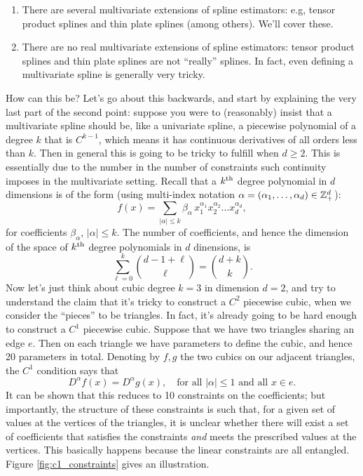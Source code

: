 \documentclass{article}
\begin{document}
\begin{enumerate}
\item There are several multivariate extensions of spline estimators: e.g,
  tensor product splines and thin plate splines (among others). We'll cover
  these. 
\item There are no real multivariate extensions of spline estimators: tensor
  product splines and thin plate splines are not ``really'' splines. In fact,
  even defining a multivariate spline is generally very tricky. 
\end{enumerate}

How can this be? Let's go about this backwards, and start by explaining the very
last part of the second point: suppose you were to (reasonably) insist that a 
multivariate spline should be, like a univariate spline, a piecewise polynomial
of a degree $k$ that is $C^{k-1}$, which means it has continuous derivatives of
all orders less than $k$. Then in general this is going to be tricky to fulfill
when $d \geq 2$. This is essentially due to the number in the number of
constraints such continuity imposes in the multivariate setting. Recall that a
$k^{\text{th}}$ degree polynomial in $d$ dimensions is of the form (using multi-index
notation $\alpha = (\alpha_1,\dots,\alpha_d) \in \mathbb{Z}^d_+$):
\begin{equation}
\label{eq:polynomial}
f(x) = \sum_{|\alpha| \leq k} \beta_\alpha \, x_1^{\alpha_1} x_2^{\alpha_2}
\dots x_d^{\alpha_d},
\end{equation}
for coefficients $\beta_\alpha$, $|\alpha| \leq k$. The number of coefficients,
and hence the dimension of the space of $k^{\text{th}}$ degree polynomials in $d$
dinensions, is
\[
\sum_{\ell=0}^k {d-1+\ell \choose \ell} = {d + k \choose k}.
\]
Now let's just think about cubic degree $k=3$ in dimension $d=2$, and try to  
understand the claim that it's tricky to construct a $C^2$ piecewise cubic,
when we consider the ``pieces'' to be triangles. In fact, it's already going to
be hard enough to construct a $C^1$ piecewise cubic. Suppose that we have two  
triangles sharing an edge $e$. Then on each triangle we have  parameters to define the cubic, and hence 20 parameters in
total. Denoting by $f,g$ the two cubics on our adjacent triangles, the $C^1$ 
condition says that
\[
D^\alpha f(x) = D^\alpha g(x), \quad \text{for all $|\alpha| \leq 1$ and all $x
  \in e$}. 
\] 
It can be shown that this reduces to 10 constraints on the coefficients; but
importantly, the structure of these constraints is such that, for a given set of
values at the vertices of the triangles, it is unclear whether there will exist
a set of coefficients that satisfies the constraints \emph{and} meets the
prescribed values at the vertices. This basically happens because the linear 
constraints are all entangled. Figure \ref{fig:c1_constraints} gives an
illustration.    
\end{document}
